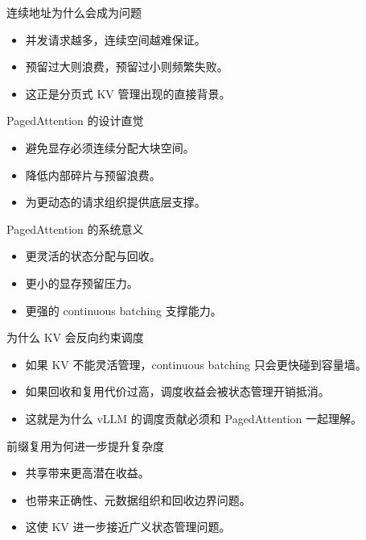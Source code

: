 \begin{frame}{连续地址为什么会成为问题}
  \begin{itemize}
    \item 并发请求越多，连续空间越难保证。
    \item 预留过大则浪费，预留过小则频繁失败。
    \item 这正是分页式 KV 管理出现的直接背景。
  \end{itemize}
\end{frame}

\begin{frame}{PagedAttention 的设计直觉}
  \begin{itemize}
    \item 避免显存必须连续分配大块空间。
    \item 降低内部碎片与预留浪费。
    \item 为更动态的请求组织提供底层支撑。
  \end{itemize}
\end{frame}

\begin{frame}{PagedAttention 的系统意义}
  \begin{itemize}
    \item 更灵活的状态分配与回收。
    \item 更小的显存预留压力。
    \item 更强的 continuous batching 支撑能力。
  \end{itemize}
\end{frame}

\begin{frame}{为什么 KV 会反向约束调度}
  \begin{itemize}
    \item 如果 KV 不能灵活管理，continuous batching 只会更快碰到容量墙。
    \item 如果回收和复用代价过高，调度收益会被状态管理开销抵消。
    \item 这就是为什么 vLLM 的调度贡献必须和 PagedAttention 一起理解。
  \end{itemize}
\end{frame}

\begin{frame}{前缀复用为何进一步提升复杂度}
  \begin{itemize}
    \item 共享带来更高潜在收益。
    \item 也带来正确性、元数据组织和回收边界问题。
    \item 这使 KV 进一步接近广义状态管理问题。
  \end{itemize}
\end{frame}

